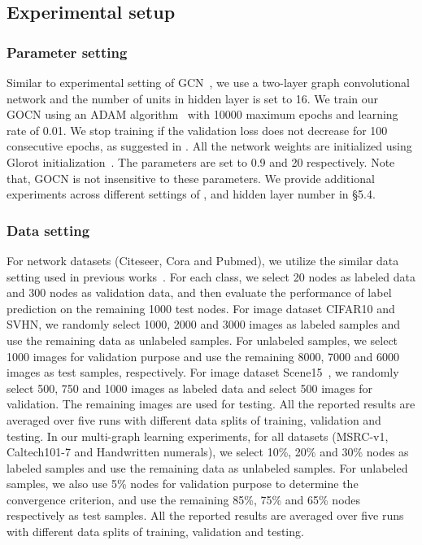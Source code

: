 \documentclass{article}
\begin{document}
\subsection{Experimental setup}

\subsubsection{Parameter setting}
Similar to experimental setting of GCN~\cite{kipf2016semi}, we use a two-layer graph convolutional network and the number of units in hidden layer is set to 16. We train our GOCN using an ADAM algorithm~\cite{Adam}  with 10000 maximum epochs and learning rate of 0.01.
We stop training if the validation loss does not decrease for 100 consecutive
epochs, as suggested in \cite{kipf2016semi}.
All the network weights are initialized using Glorot initialization~\cite{glorot2010understanding}.
The parameters  are set to 0.9 and 20 respectively. Note that, GOCN is not insensitive to these parameters. We provide additional experiments across different settings of ,   and hidden layer number in \S 5.4.


\subsubsection{Data setting}

For network datasets (Citeseer, Cora and Pubmed), we utilize the similar data setting used in previous works~\cite{kipf2016semi,velickovic2017graph}. For each class, we select 20 nodes as labeled data and 300 nodes as validation data, and then evaluate the performance of label prediction on the remaining 1000 test nodes.
For image dataset CIFAR10 and SVHN,
we randomly select 1000, 2000 and 3000 images as labeled samples and use the
remaining data as unlabeled samples.
For unlabeled samples, we select 1000 images for validation purpose and
use the remaining 8000, 7000 and 6000 images as test samples, respectively.
For image dataset Scene15~\cite{jiang2013label}, we randomly select 500, 750 and 1000 images as labeled data and select 500 images for validation. The remaining images are used for testing.
All the reported results are averaged over five runs  with different  data splits of training, validation and testing.
In our multi-graph learning experiments, for all datasets (MSRC-v1, Caltech101-7 and Handwritten numerals), we select 10\%, 20\% and 30\% nodes as labeled samples and use the remaining data as unlabeled samples.
For unlabeled samples, we also use 5\% nodes for validation purpose to determine the convergence criterion, and use the remaining 85\%, 75\% and 65\% nodes respectively as test samples.
All the reported results are averaged over five runs  with different data splits of training, validation and testing.
\end{document}
